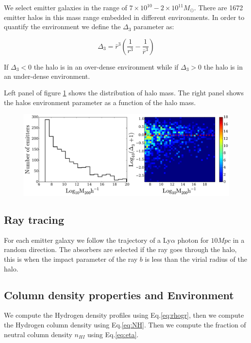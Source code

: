 \documentclass[a4,useAMS,usenatbib,usegraphicx]{mn2e}
\begin{document}
We select emitter galaxies in the range of $7 \times 10^{10} - 2
\times 10^{11} M_{\odot}$.
There are 1672 emitter halos in this mass range embedded in different
environments. In order to quantify the environment we
define the $\Delta_3$ parameter as:

\begin{equation}
\Delta_3  = \bar{r}^3 \left( \dfrac{1}{r^3} - \dfrac{1}{\bar{r}^3} \right)
\end{equation}

If $\Delta_3 < 0 $ the halo is in an over-dense environment while
if $\Delta_3 > 0 $ the halo is in an under-dense environment.

Left panel of figure \ref{fig:Halos_prop} shows the distribution of
halo mass. The right panel shows the halos environment parameter as a function
of the halo mass.

\begin{figure}
\centering
\includegraphics[scale=0.5]{../figures/absorbers_prop.pdf}
\caption{\label{fig:Halos_prop}}
\end{figure}

\subsection{Ray tracing}

For each emitter galaxy we follow the trajectory of a Ly$\alpha$ photon
for $10 Mpc$ in a random direction. The absorbers are selected if the
ray goes through the halo, this is when the impact parameter of the
ray $b$ is less than the virial radius of the halo.

\subsection{Column density properties and Environment}

We compute the Hydrogen density profiles using Eq.\ref{eq:rhogr}, then
we compute the Hydrogen column density using Eq.\ref{eq:NH}. Then we compute
the fraction of neutral column density $n_{HI}$ using Eq.\ref{eq:eta}.
\end{document}
